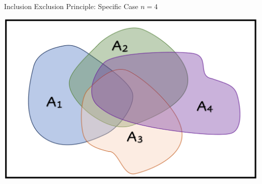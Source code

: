 \documentclass[compress]{beamer}
\begin{document}
\begin{frame}{Inclusion Exclusion Principle: Specific Case  $n=4$}
\begin{center}
\includegraphics[scale=.3]{figs/InclusionExclusion4.png}
\end{center}

	\vspace{1in}
\end{frame}




\begin{frame}

\end{frame}
\end{document}
